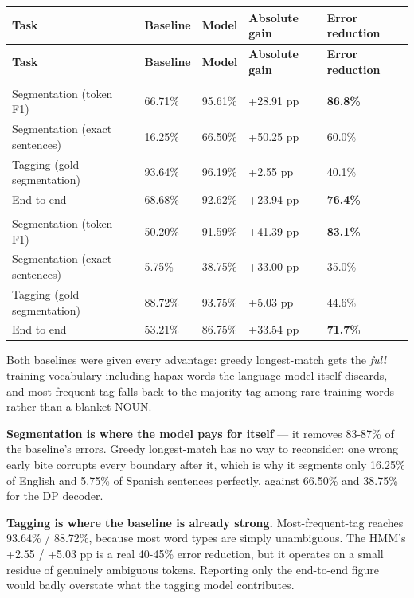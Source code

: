 \documentclass[11pt,a4paper]{article}
\begin{document}
{\small
\setlength{\tabcolsep}{4pt}
\begin{xltabular}{\linewidth}{>{\raggedright\arraybackslash}Xllll}
\toprule
\textbf{Task} & \textbf{Baseline} & \textbf{Model} & \textbf{Absolute gain} & \textbf{Error reduction} \\
\midrule
\endfirsthead
\toprule
\textbf{Task} & \textbf{Baseline} & \textbf{Model} & \textbf{Absolute gain} & \textbf{Error reduction} \\
\midrule
\endhead
{} \\
Segmentation (token F1) & 66.71\% & 95.61\% & +28.91 pp & \textbf{86.8\%} \\
Segmentation (exact sentences) & 16.25\% & 66.50\% & +50.25 pp & 60.0\% \\
Tagging (gold segmentation) & 93.64\% & 96.19\% & +2.55 pp & 40.1\% \\
End to end & 68.68\% & 92.62\% & +23.94 pp & \textbf{76.4\%} \\
 \\
Segmentation (token F1) & 50.20\% & 91.59\% & +41.39 pp & \textbf{83.1\%} \\
Segmentation (exact sentences) & 5.75\% & 38.75\% & +33.00 pp & 35.0\% \\
Tagging (gold segmentation) & 88.72\% & 93.75\% & +5.03 pp & 44.6\% \\
End to end & 53.21\% & 86.75\% & +33.54 pp & \textbf{71.7\%} \\
\bottomrule
\end{xltabular}}

Both baselines were given every advantage: greedy longest-match gets the \textit{full} training vocabulary including hapax words the language model itself discards, and most-frequent-tag falls back to the majority tag among rare training words rather than a blanket NOUN.

\textbf{Segmentation is where the model pays for itself} --- it removes 83-87\% of the baseline's errors. Greedy longest-match has no way to reconsider: one wrong early bite corrupts every boundary after it, which is why it segments only 16.25\% of English and 5.75\% of Spanish sentences perfectly, against 66.50\% and 38.75\% for the DP decoder.

\textbf{Tagging is where the baseline is already strong.} Most-frequent-tag reaches 93.64\% / 88.72\%, because most word types are simply unambiguous. The HMM's +2.55 / +5.03 pp is a real 40-45\% error reduction, but it operates on a small residue of genuinely ambiguous tokens. Reporting only the end-to-end figure would badly overstate what the tagging model contributes.
\end{document}
